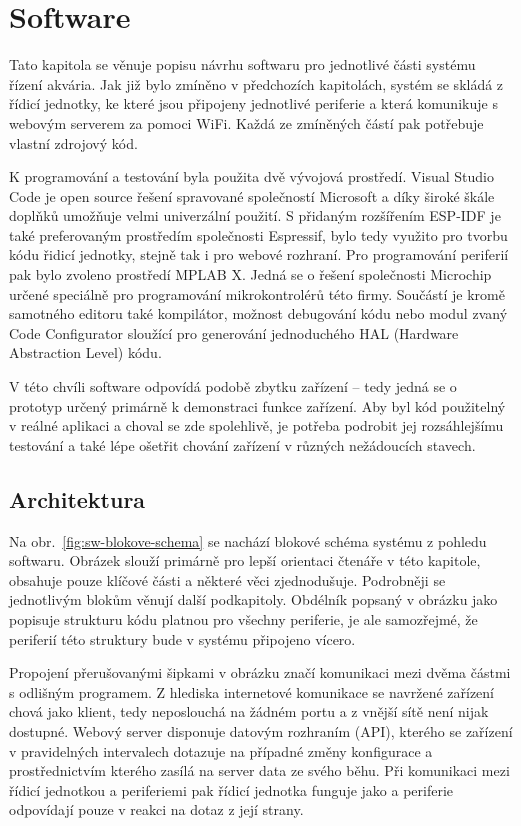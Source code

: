 \chapter{Software}
    Tato kapitola se věnuje popisu návrhu softwaru pro jednotlivé části systému řízení akvária. Jak již bylo zmíněno v předchozích kapitolách, systém se skládá z řídicí jednotky, ke které jsou připojeny jednotlivé periferie a která komunikuje s webovým serverem za pomoci WiFi. Každá ze zmíněných částí pak potřebuje vlastní zdrojový kód. 
    
    K programování a testování byla použita dvě vývojová prostředí. Visual Studio Code je open source řešení spravované společností Microsoft a díky široké škále doplňků umožňuje velmi univerzální použití. S přidaným rozšířením ESP-IDF je také preferovaným prostředím společnosti Espressif, bylo tedy využito pro tvorbu kódu řidicí jednotky, stejně tak i pro webové rozhraní. Pro programování periferií pak bylo zvoleno prostředí MPLAB X. Jedná se o řešení společnosti Microchip určené speciálně pro programování mikrokontrolérů této firmy. Součástí je kromě samotného editoru také kompilátor, možnost debugování kódu nebo modul zvaný Code Configurator sloužící pro generování jednoduchého HAL (Hardware Abstraction Level) kódu.

    V této chvíli software odpovídá podobě zbytku zařízení -- tedy jedná se o prototyp určený primárně k demonstraci funkce zařízení. Aby byl kód použitelný v reálné aplikaci a choval se zde spolehlivě, je potřeba podrobit jej rozsáhlejšímu testování a také lépe ošetřit chování zařízení v různých nežádoucích stavech.   

\section{Architektura}
    Na obr.~\ref{fig:sw-blokove-schema} se nachází blokové schéma systému z pohledu softwaru. Obrázek slouží primárně pro lepší orientaci čtenáře v této kapitole, obsahuje pouze klíčové části a některé věci zjednodušuje. Podrobněji se jednotlivým blokům věnují další podkapitoly. Obdélník popsaný v obrázku jako  popisuje strukturu kódu platnou pro všechny periferie, je ale samozřejmé, že periferií této struktury bude v systému připojeno vícero.

    Propojení přerušovanými šipkami v obrázku značí komunikaci mezi dvěma částmi s odlišným programem. Z hlediska internetové komunikace se navržené zařízení chová jako klient, tedy neposlouchá na žádném portu a z vnější sítě není nijak dostupné. Webový server disponuje datovým rozhraním (API), kterého se zařízení v pravidelných intervalech dotazuje na případné změny konfigurace a prostřednictvím kterého zasílá na server data ze svého běhu. Při komunikaci mezi řídicí jednotkou a periferiemi pak řídicí jednotka funguje jako  a periferie odpovídají pouze v reakci na dotaz z její strany.

